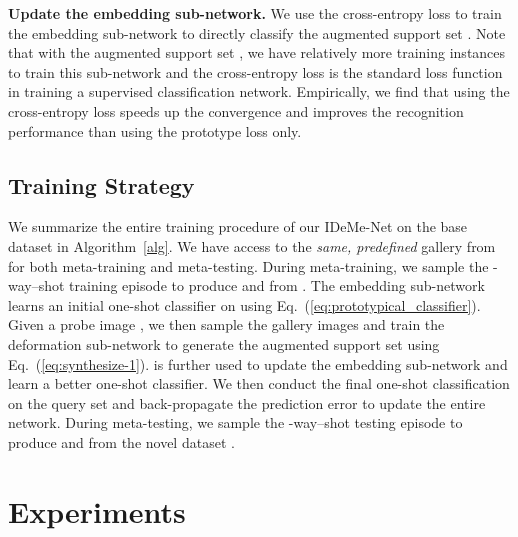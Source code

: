 \documentclass[10pt,letterpaper,twocolumn]{article}
\begin{document}
\noindent \textbf{Update the embedding sub-network. }We use the cross-entropy
loss to train the embedding sub-network to directly classify the augmented
support set . Note that with the augmented support set
, we have relatively more training instances to train this
sub-network and the cross-entropy loss is the standard loss function
in training a supervised classification network. Empirically, we find
that using the cross-entropy loss speeds up the convergence and improves
the recognition performance than using the prototype loss only.

\subsection{Training Strategy}

We summarize the entire training procedure of our IDeMe-Net
on the base dataset  in Algorithm~\ref{alg}. We have access to the {\em same, predefined} gallery  from  for both meta-training and meta-testing. During meta-training,
we sample the -way--shot training
episode to produce  and  from . The embedding sub-network learns
an initial one-shot classifier on  using Eq.~(\ref{eq:prototypical_classifier}). Given
a probe image , we then sample the gallery images
 and train the deformation sub-network
to generate the augmented support set  using Eq.~(\ref{eq:synthesize-1}).
 is further used to update the embedding sub-network and
learn a better one-shot classifier. We then conduct the final one-shot
classification on the query set  and back-propagate the prediction
error to update the entire network. During meta-testing, we sample
the -way--shot testing episode to produce  and  from
the novel dataset .

\section{Experiments}
\end{document}
